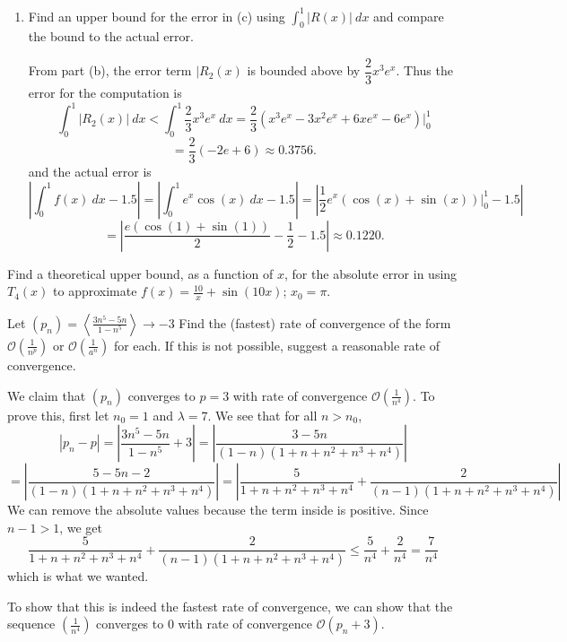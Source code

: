 \documentclass{article}
\theoremstyle{plain} %
\numberwithin{thm}{section} %
\theoremstyle{definition}
\begin{document}
\begin{question}{3}
\begin{enumerate}[label=(\alph*)]
            \item Find an upper bound for the error in (c) using \(\int _0^1 |R(x)|\ dx\) and compare the bound to the actual error.
            
            From part (b), the error term \(|R_2(x)\) is bounded above by \(\dfrac{2}{3}x^3 e^x\). Thus the error for the computation is
            \[
                \int _0^1 |R_2(x)|\ dx < \int _0^1 \dfrac{2}{3}x^3 e^x\ dx = \frac{2}{3}\left( x^3e^x - 3x^2e^x + 6xe^x - 6e^x \right) \Big|_0^1
            \]
            \[
                = \frac{2}{3}(-2e + 6) \approx 0.3756.
            \]
            and the actual error is
            \[
                \left\vert \int _0^1 f(x)\ dx - 1.5 \right\vert = \left\vert \int _0^1 e^x \cos (x)\ dx - 1.5 \right\vert = \left\vert \frac{1}{2}e^x(\cos (x) + \sin (x))\Big|_0^1 - 1.5 \right\vert
            \]
            \[
                = \left\vert \frac{e(\cos (1) + \sin (1))}{2} - \frac{1}{2} - 1.5 \right\vert \approx 0.1220.
            \]
        \end{enumerate}
    \end{question}
    \newpage
    \begin{question}{4}
        Find a theoretical upper bound, as a function of \(x\), for the absolute error in using \(T_4(x)\) to approximate \(f(x) = \frac{10}{x} + \sin(10x)\); \(x_0 = \pi\).
    \end{question}
    \newpage
    \begin{question}{5}
        Let \((p_n) = \left\langle \frac{3n^5 - 5n}{1 - n^5} \right\rangle \to -3\) Find the (fastest) rate of convergence of the form \(\mathcal{O}\left(\frac{1}{n^p}\right)\) or \(\mathcal{O}\left(\frac{1}{a^n}\right)\) for each. If this is not possible, suggest a reasonable rate of convergence.

        We claim that \((p_n)\) converges to \(p = 3\) with rate of convergence \(\mathcal{O} \left(\frac{1}{n^4}\right)\). To prove this, first let \(n_0 = 1\) and \(\lambda = 7\). We see that for all \(n > n_0\),
        \[
            |p_n - p| = \left\vert \frac{3n^5 - 5n}{1 - n^5} + 3 \right\vert = \left\vert \frac{3 - 5n}{(1 - n)(1 + n + n^2 + n^3 + n^4)} \right\vert
        \]
        \[
            = \left\vert \frac{5 - 5n - 2}{(1 - n)(1 + n + n^2 + n^3 + n^4)} \right\vert = \left\vert \frac{5}{1 + n + n^2 + n^3 + n^4} + \frac{2}{(n - 1)(1 + n + n^2 + n^3 + n^4)} \right\vert
        \]
        We can remove the absolute values because the term inside is positive. Since \(n - 1 > 1\), we get
        \[
            \frac{5}{1 + n + n^2 + n^3 + n^4} + \frac{2}{(n - 1)(1 + n + n^2 + n^3 + n^4)} \leq \frac{5}{n^4} + \frac{2}{n^4} = \frac{7}{n^4}
        \]
        which is what we wanted.

        To show that this is indeed the fastest rate of convergence, we can show that the sequence \(\left( \frac{1}{n^4} \right)\) converges to 0 with rate of convergence \(\mathcal{O} \left( p_n + 3 \right)\).
    \end{question}
\end{document}
